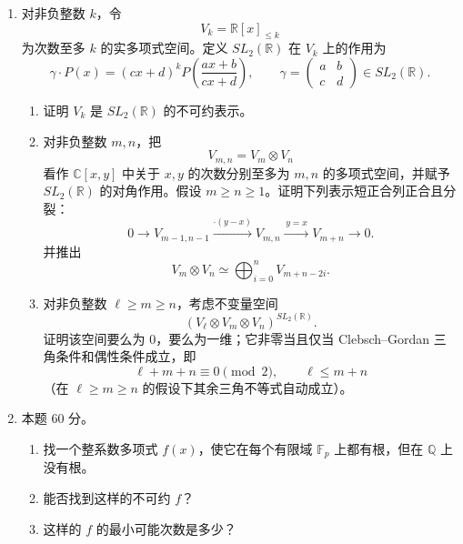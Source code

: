 \documentclass[UTF8,12pt]{ctexart}
\begin{document}
\begin{enumerate}[label=\textbf{\arabic*.},leftmargin=2.2em]
\item 对非负整数 \(k\)，令
\[
V_k=\mathbb R[x]_{\le k}
\]
为次数至多 \(k\) 的实多项式空间。定义 \(SL_2(\mathbb R)\) 在 \(V_k\) 上的作用为
\[
\gamma\cdot P(x)=(cx+d)^kP\!\left(\frac{ax+b}{cx+d}\right),
\qquad
\gamma=\begin{pmatrix}a&b\\c&d\end{pmatrix}\in SL_2(\mathbb R).
\]
\begin{enumerate}[label=\textbf{4.\arabic*},leftmargin=2.4em]
\item 证明 \(V_k\) 是 \(SL_2(\mathbb R)\) 的不可约表示。
\item 对非负整数 \(m,n\)，把
\[
V_{m,n}=V_m\otimes V_n
\]
看作 \(\mathbb C[x,y]\) 中关于 \(x,y\) 的次数分别至多为 \(m,n\) 的多项式空间，并赋予 \(SL_2(\mathbb R)\) 的对角作用。假设 \(m\ge n\ge1\)。证明下列表示短正合列正合且分裂：
\[
0\longrightarrow V_{m-1,n-1}
\xrightarrow{\cdot(y-x)}
V_{m,n}
\xrightarrow{\,y=x\,}
V_{m+n}
\longrightarrow0.
\]
并推出
\[
V_m\otimes V_n\simeq \bigoplus_{i=0}^{n}V_{m+n-2i}.
\]
\item 对非负整数 \(\ell\ge m\ge n\)，考虑不变量空间
\[
(V_\ell\otimes V_m\otimes V_n)^{SL_2(\mathbb R)}.
\]
证明该空间要么为 \(0\)，要么为一维；它非零当且仅当 Clebsch--Gordan 三角条件和偶性条件成立，即
\[
\ell+m+n\equiv0\pmod2,\qquad \ell\le m+n
\]
（在 \(\ell\ge m\ge n\) 的假设下其余三角不等式自动成立）。
\end{enumerate}

\item 本题 60 分。
\begin{enumerate}[label=\textbf{5.\arabic*},leftmargin=2.4em]
\item 找一个整系数多项式 \(f(x)\)，使它在每个有限域 \(\mathbb F_p\) 上都有根，但在 \(\mathbb Q\) 上没有根。
\item 能否找到这样的不可约 \(f\)？
\item 这样的 \(f\) 的最小可能次数是多少？
\end{enumerate}
\end{enumerate}
\end{document}
